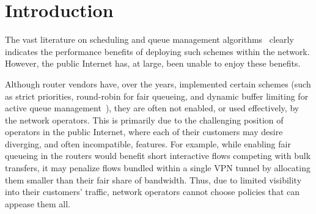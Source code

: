 \section{Introduction}\label{s:intro}



The vast literature on scheduling and queue management algorithms~\cite{diffserv, fair-queueing, sfq, pie, CoDel, fifoplus, virtualClocks, csfq, drr, red, ecn} clearly indicates the performance benefits of deploying such schemes within the network. However, the public Internet has, at large, been unable to enjoy these benefits. 

Although router vendors have, over the years, implemented certain schemes (such as strict priorities, round-robin for fair queueing, and dynamic buffer limiting for active queue management~\cite{cisco-qos}), they are often not enabled, or used effectively, by the network operators. 
This is primarily due to the challenging position of operators in the public Internet, where each of their customers may desire diverging, and often incompatible, features. For example, while enabling fair queueing in the routers would benefit short interactive flows competing with bulk transfers, it may penalize flows bundled within a single VPN tunnel by allocating them smaller than their fair share of bandwidth. 
Thus, due to limited visibility into their customers' traffic, network operators cannot choose policies that can appease them all. 

